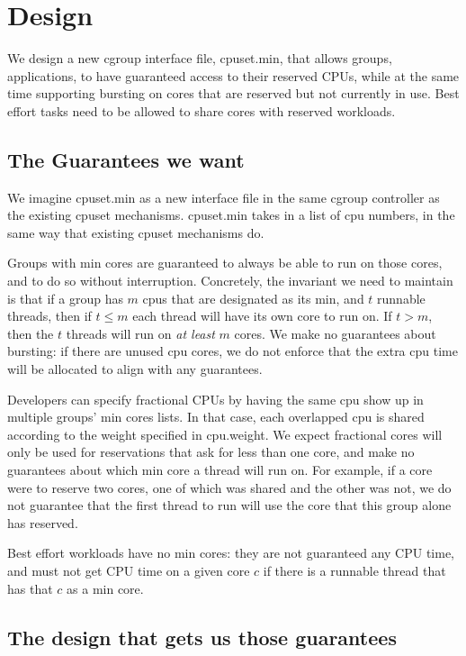 \section{Design}\label{s:design}

We design a new cgroup interface file, cpuset.min, that allows groups, \ie{}
applications, to have guaranteed access to their reserved CPUs, while at the
same time supporting bursting on cores that are reserved but not currently in
use. Best effort tasks need to be allowed to share cores with reserved
workloads.

\subsection{The Guarantees we want}

We imagine cpuset.min as a new interface file in the same cgroup controller as
the existing cpuset mechanisms. cpuset.min takes in a list of cpu numbers, in
the same way that existing cpuset mechanisms do.

Groups with min cores are guaranteed to always be able to run on those cores,
and to do so without interruption. Concretely, the invariant we need to maintain is that if a
group has $m$ cpus that are designated as its min, and $t$ runnable threads,
then if $t \leq m$ each thread will have its own core to run on. If $t > m$,
then the $t$ threads will run on \textit{at least} $m$ cores. We make no
guarantees about bursting: if there are unused cpu cores, we do not enforce that
the extra cpu time will be allocated to align with any guarantees.

Developers can specify fractional CPUs by having the same cpu show up in
multiple groups' min cores lists. In that case, each overlapped cpu is shared
according to the weight specified in cpu.weight. We expect fractional cores will
only be used for reservations that ask for less than one core, and make no
guarantees about which min core a thread will run on. For example, if a core
were to reserve two cores, one of which was shared and the other was not, we do
not guarantee that the first thread to run will use the core that this group
alone has reserved.

Best effort workloads have no min cores: they are not guaranteed any CPU time,
and must not get CPU time on a given core $c$ if there is a runnable thread that
has that $c$ as a min core.

\subsection{The design that gets us those guarantees}

